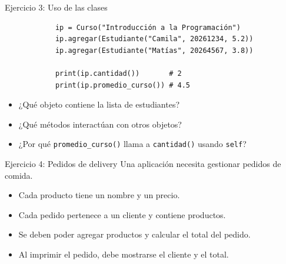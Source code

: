 \documentclass{beamer}
\begin{document}
    \begin{frame}[fragile,t]{Ejercicio 3: Uso de las clases}
        \begin{verbatim}
            ip = Curso("Introducción a la Programación")
            ip.agregar(Estudiante("Camila", 20261234, 5.2))
            ip.agregar(Estudiante("Matías", 20264567, 3.8))
            
            print(ip.cantidad())       # 2
            print(ip.promedio_curso()) # 4.5
        \end{verbatim}
        \pause


        \begin{itemize}
            \item ¿Qué objeto contiene la lista de estudiantes?
            \item ¿Qué métodos interactúan con otros objetos?
            \item ¿Por qué \texttt{promedio_curso()} llama a \texttt{cantidad()} usando \texttt{self}?
        \end{itemize}
    \end{frame}
    
    \begin{frame}{Ejercicio 4: Pedidos de delivery}
        Una aplicación necesita gestionar pedidos de comida.
        \begin{itemize}
            \item Cada producto tiene un nombre y un precio.
            \item Cada pedido pertenece a un cliente y contiene productos.
            \item Se deben poder agregar productos y calcular el total del pedido.
            \item Al imprimir el pedido, debe mostrarse el cliente y el total.
        \end{itemize}
    \end{frame}
    
\end{document}
